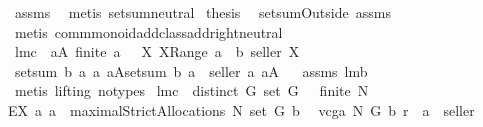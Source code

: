 \begin{isabellebody}
\ assms\ \isamarkupfalse%
\ {\isacharparenleft}metis\ setsum{\isachardot}neutral{\isacharparenright}\isanewline
{}\isamarkupfalse%
\ {\isacharquery}thesis\ \isamarkupfalse%
\ setsumOutside\ assms{\isacharparenleft}{}{\isacharparenright}\ \isamarkupfalse%
\ {\isacharparenleft}metis\ comm{\isacharunderscore}monoid{\isacharunderscore}add{\isacharunderscore}class{\isachardot}add{\isachardot}right{\isacharunderscore}neutral{\isacharparenright}\isanewline
{}\isamarkupfalse%
%
\endisatagproof
{\isafoldproof}%
%
\isadelimproof
\isanewline
%
\endisadelimproof
\isanewline
{}\isamarkupfalse%
\ lm{}{}c{\isacharcolon}\ \ {\isachardoublequoteopen}{\isasymforall}a{\isasymin}A{\isachardot}\ finite\ a\ {\isacharampersand}\ {\isacharparenleft}{\isasymforall}\ X{\isachardot}\ X{\isasymin}Range\ a\ {\isasymlongrightarrow}\ b\ {\isacharparenleft}seller{\isacharcomma}\ X{\isacharparenright}{\isacharequal}{}{\isacharparenright}{\isachardoublequoteclose}\isanewline
{}\ {\isachardoublequoteopen}{\isacharbraceleft}setsum\ b\ a{\isacharbar}\ a{\isachardot}\ a{\isasymin}A{\isacharbraceright}{\isacharequal}{\isacharbraceleft}setsum\ b\ {\isacharparenleft}a\ {\isacharminus}{\isacharminus}\ seller{\isacharparenright}{\isacharbar}\ a{\isachardot}\ a{\isasymin}A{\isacharbraceright}{\isachardoublequoteclose}%
\isadelimproof
\ %
\endisadelimproof
%
\isatagproof
{}\isamarkupfalse%
\ assms\ lm{}{}b\ \isanewline
{}\isamarkupfalse%
\ {\isacharparenleft}metis\ {\isacharparenleft}lifting{\isacharcomma}\ no{\isacharunderscore}types{\isacharparenright}{\isacharparenright}%
\endisatagproof
{\isafoldproof}%
%
\isadelimproof
%
\endisadelimproof
\isanewline
{}\isamarkupfalse%
\ lm{}{}c{\isacharcolon}\ \ {\isachardoublequoteopen}distinct\ G{\isachardoublequoteclose}\ {\isachardoublequoteopen}set\ G\ {\isasymnoteq}\ {\isacharbraceleft}{\isacharbraceright}{\isachardoublequoteclose}\ {\isachardoublequoteopen}finite\ N{\isachardoublequoteclose}\ \isanewline
{\isachardoublequoteopen}EX\ a{\isachardot}\ {\isacharparenleft}{\isacharparenleft}a\ {\isasymin}\ {\isacharparenleft}maximalStrictAllocations{\isacharprime}\ N\ {\isacharparenleft}set\ G{\isacharparenright}\ b{\isacharparenright}{\isacharparenright}\ \isanewline
{\isacharampersand}\ {\isacharparenleft}vcga{\isacharprime}\ N\ G\ b\ r\ {\isacharequal}\ a\ {\isacharminus}{\isacharminus}\ seller{\isacharparenright}\ \isanewline

\end{isabellebody}
